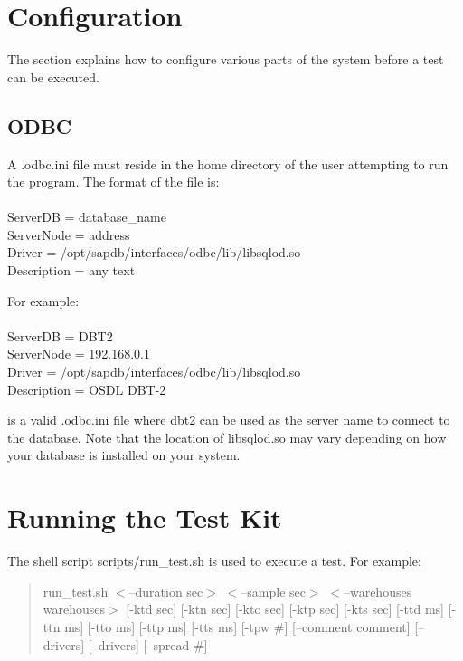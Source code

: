 \documentclass{article}
\begin{document}
\section{Configuration}

The section explains how to configure various parts of the system before a
test can be executed.

\subsection{ODBC}

A .odbc.ini file must reside in the home directory of the user
attempting to run the program.  The format of the file is: \\
\indent [alias] \\
\indent ServerDB = database\_name \\
\indent ServerNode = address \\
\indent Driver = /opt/sapdb/interfaces/odbc/lib/libsqlod.so \\
\indent Description = any text

\noindent
\indent For example: \\
\indent [dbt2] \\
\indent ServerDB = DBT2 \\
\indent ServerNode = 192.168.0.1 \\
\indent Driver = /opt/sapdb/interfaces/odbc/lib/libsqlod.so \\
\indent Description = OSDL DBT-2

\noindent
is a valid .odbc.ini file where dbt2 can be used as the server name to
connect to the database.  Note that the location of libsqlod.so may vary
depending on how your database is installed on your system.

\section{Running the Test Kit}

\noindent
The shell script scripts/run\_test.sh is used to execute a test.  For
example:
\begin{verse}
run\_test.sh $<$--duration sec$>$ $<$--sample sec$>$ $<$--warehouses warehouses$>$ [-ktd sec] [-ktn sec] [-kto sec] [-ktp sec] [-kts sec] [-ttd ms] [-ttn ms] [-tto ms] [-ttp ms] [-tts ms] [-tpw \#] [--comment comment] [--drivers] [--drivers] [--spread \#]
\end{verse}
\end{document}
